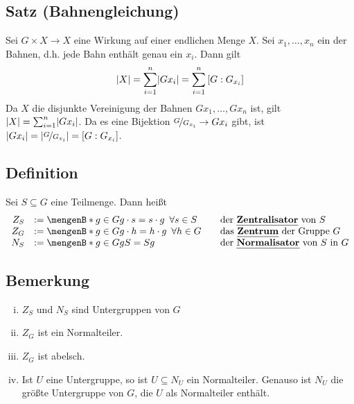 \subsection{Satz (Bahnengleichung)} %
\label{sub:310}\hypertarget{bahnengleichung}{ }
Sei $G \times X \to X$ eine Wirkung auf einer endlichen Menge $X$. Sei $x_1, \ldots ,x_n$ ein  der Bahnen, d.h. jede Bahn enthält genau ein $x_i$. Dann gilt
\[
	\abs*{X} = \sum_{i=1}^{n} \abs*{Gx_i}= \sum_{i=1}^{n} \left[G:G_{x_i}\right]  
\]
Da $X$ die disjunkte Vereinigung der Bahnen $Gx_1, \ldots , Gx_n$ ist, gilt $\abs*{X} = \sum_{i=1}^{n} \abs*{Gx_i}  $. Da es eine Bijektion $\nicefrac{G}{G_{x_i}} \to Gx_i$
gibt, ist $\abs*{Gx_i} = \abs*{\nicefrac{G}{G_{x_i}}} = \left[ G : G_{x_i} \right]  $. \bewende

\subsection[Definition: Zentralisator, Zentrum und Normalisator]{Definition} %
\label{sub:311}
Sei $S \subseteq G$ eine Teilmenge. Dann heißt 
\[
	\begin{array}{rll}
	Z_S &:= \set[g \in G]{g \cdot s=s \cdot g \enspace\forall s \in S} & \quad \text{der \Index{Zentralisator} von $S$}\\
	Z_G &:= \set[g \in G]{g \cdot h = h \cdot g \enspace\forall h \in G} & \quad \text{das \Index{Zentrum} der Gruppe $G$}\\
	N_S &:= \set[g \in G]{gS=Sg} & \quad \text{der \Index{Normalisator} von $S$ in $G$}
\end{array}
\]

\subsection[Bemerkung: Eigenschaften von von Zentralisator, Normalisator und Zentrum]{Bemerkung} %
\label{sub:312}
\begin{enumerate}[(i)]
	\item $Z_S$ und $N_S$ sind Untergruppen von $G$
	\item $Z_G$ ist ein Normalteiler.
	\item $Z_G$ ist abelsch.
	\item Ist $U$ eine Untergruppe, so ist $U \subseteq N_U$ ein Normalteiler. Genauso ist $N_U$ die größte Untergruppe von $G$, die $U$ als Normalteiler enthält.
\end{enumerate}

